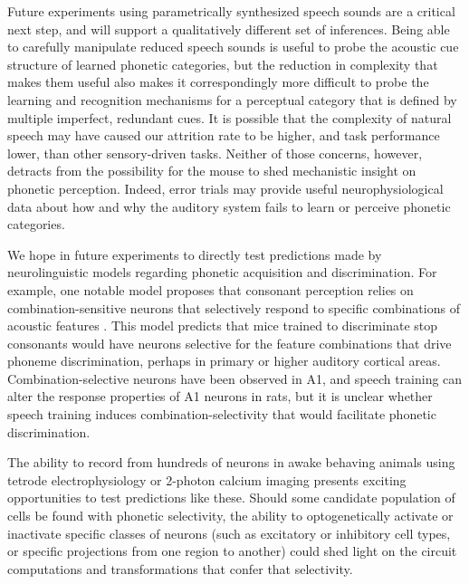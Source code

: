 Future experiments using parametrically synthesized speech sounds are a critical next step, and will support a qualitatively different set of inferences. Being able to carefully manipulate reduced speech sounds is useful to probe the acoustic cue structure of learned phonetic categories, but the reduction in complexity that makes them useful also makes it correspondingly more difficult to probe the learning and recognition mechanisms for a perceptual category that is defined by multiple imperfect, redundant cues. It is possible that the complexity of natural speech may have caused our attrition rate to be higher, and task performance lower, than other sensory-driven tasks. Neither of those concerns, however, detracts from the possibility for the mouse to shed mechanistic insight on phonetic perception. Indeed, error trials may provide useful neurophysiological data about how and why the auditory system fails to learn or perceive phonetic categories.

We hope in future experiments to directly test predictions made by neurolinguistic models regarding phonetic acquisition and discrimination. For example, one notable model proposes that consonant perception relies on combination-sensitive neurons that selectively respond to specific combinations of acoustic features \cite{Sussman1998}. This model predicts that mice trained to discriminate stop consonants would have neurons selective for the feature combinations that drive phoneme discrimination, perhaps in primary or higher auditory cortical areas. Combination-selective neurons have been observed in A1\cite{Sadagopan2009,Wang2005a}, and speech training can alter the response properties of A1 neurons in rats\cite{Engineer2015}, but it is unclear whether speech training induces combination-selectivity that would facilitate phonetic discrimination.

The ability to record from hundreds of neurons in awake behaving animals using tetrode electrophysiology or 2-photon calcium imaging presents exciting opportunities to test predictions like these. Should some candidate population of cells be found with phonetic selectivity, the ability to optogenetically activate or inactivate specific classes of neurons (such as excitatory or inhibitory cell types, or specific projections from one region to another) could shed light on the circuit computations and transformations that confer that selectivity.

%
%
%
%
